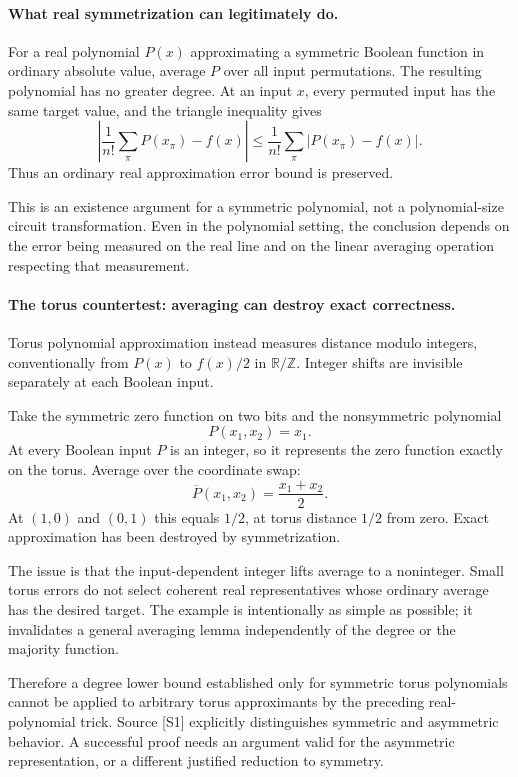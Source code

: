 \documentclass[11pt]{article}
\begin{document}
\paragraph{What real symmetrization can legitimately do.}
For a real polynomial $P(x)$ approximating a symmetric Boolean function in ordinary absolute value, average $P$ over all input permutations. The resulting polynomial has no greater degree. At an input $x$, every permuted input has the same target value, and the triangle inequality gives
\[
 \left|\frac1{n!}\sum_\pi P(x_\pi)-f(x)\right|
 \le \frac1{n!}\sum_\pi |P(x_\pi)-f(x)|.
\]
Thus an ordinary real approximation error bound is preserved.

This is an existence argument for a symmetric polynomial, not a polynomial-size circuit transformation. Even in the polynomial setting, the conclusion depends on the error being measured on the real line and on the linear averaging operation respecting that measurement.

\paragraph{The torus countertest: averaging can destroy exact correctness.}
Torus polynomial approximation instead measures distance modulo integers, conventionally from $P(x)$ to $f(x)/2$ in $\mathbb R/\mathbb Z$. Integer shifts are invisible separately at each Boolean input.

Take the symmetric zero function on two bits and the nonsymmetric polynomial
\[
 P(x_1,x_2)=x_1.
\]
At every Boolean input $P$ is an integer, so it represents the zero function exactly on the torus. Average over the coordinate swap:
\[
 \overline P(x_1,x_2)=\frac{x_1+x_2}{2}.
\]
At $(1,0)$ and $(0,1)$ this equals $1/2$, at torus distance $1/2$ from zero. Exact approximation has been destroyed by symmetrization.

The issue is that the input-dependent integer lifts average to a noninteger. Small torus errors do not select coherent real representatives whose ordinary average has the desired target. The example is intentionally as simple as possible; it invalidates a general averaging lemma independently of the degree or the majority function.

Therefore a degree lower bound established only for symmetric torus polynomials cannot be applied to arbitrary torus approximants by the preceding real-polynomial trick. Source [S1] explicitly distinguishes symmetric and asymmetric behavior. A successful proof needs an argument valid for the asymmetric representation, or a different justified reduction to symmetry.
\end{document}
